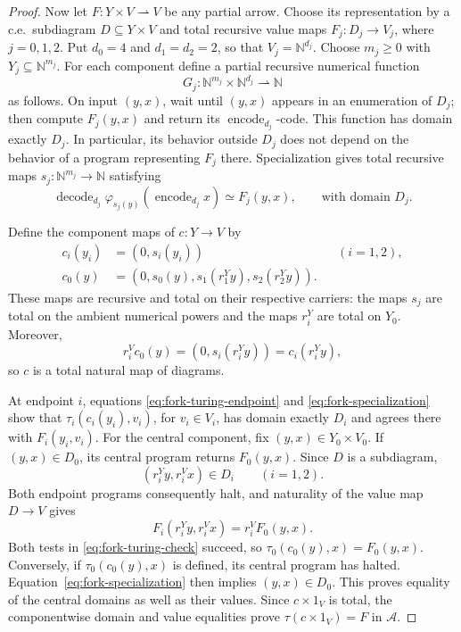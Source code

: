 \documentclass[11pt]{article}
\newcommand{\N}{\mathbb N}
\begin{document}
\begin{proof}
Now let $F:Y\times V\rightharpoonup V$ be any partial arrow.
Choose its representation by a c.e.\ subdiagram
$D\subseteq Y\times V$ and total recursive value maps
$F_j:D_j\to V_j$, where $j=0,1,2$.
Put $d_0=4$ and $d_1=d_2=2$, so that $V_j=\N^{d_j}$.
Choose $m_j\geq0$ with $Y_j\subseteq\N^{m_j}$.
For each component define a partial recursive numerical function
\[
 G_j:\N^{m_j}\times\N^{d_j}\rightharpoonup\N
\]
as follows. On input $(y,x)$, wait until $(y,x)$ appears in an
enumeration of $D_j$; then compute $F_j(y,x)$ and return its
$\operatorname{encode}_{d_j}$-code. This function has domain
exactly $D_j$. In particular, its behavior outside $D_j$ does
not depend on the behavior of a program representing $F_j$ there.
Specialization gives total recursive maps
$s_j:\N^{m_j}\to\N$ satisfying
\begin{equation}\label{eq:fork-specialization}
 \operatorname{decode}_{d_j}
   \varphi_{s_j(y)}(\operatorname{encode}_{d_j}x)
 \simeq F_j(y,x),
 \qquad\text{with domain }D_j.
\end{equation}

Define the component maps of $c:Y\to V$ by
\begin{align*}
 c_i(y_i)&=(0,s_i(y_i)) &&(i=1,2),\\
 c_0(y)&=(0,s_0(y),s_1(r_1^Yy),s_2(r_2^Yy)).
\end{align*}
These maps are recursive and total on their respective carriers:
the maps $s_j$ are total on the ambient numerical powers and the
maps $r_i^Y$ are total on $Y_0$. Moreover,
\[
 r_i^Vc_0(y)=(0,s_i(r_i^Yy))=c_i(r_i^Yy),
\]
so $c$ is a total natural map of diagrams.

At endpoint $i$, equations
\eqref{eq:fork-turing-endpoint} and
\eqref{eq:fork-specialization} show that
$\tau_i(c_i(y_i),v_i)$, for $v_i\in V_i$, has domain exactly
$D_i$ and agrees there with $F_i(y_i,v_i)$.
For the central component, fix $(y,x)\in Y_0\times V_0$.
If $(y,x)\in D_0$, its central program returns $F_0(y,x)$.
Since $D$ is a subdiagram,
\[
 (r_i^Yy,r_i^Vx)\in D_i\qquad(i=1,2).
\]
Both endpoint programs consequently halt, and naturality of
the value map $D\to V$ gives
\[
 F_i(r_i^Yy,r_i^Vx)=r_i^VF_0(y,x).
\]
Both tests in \eqref{eq:fork-turing-check} succeed, so
$\tau_0(c_0(y),x)=F_0(y,x)$.
Conversely, if $\tau_0(c_0(y),x)$ is defined, its central
program has halted. Equation~\eqref{eq:fork-specialization}
then implies $(y,x)\in D_0$.
This proves equality of the central domains as well as their
values. Since $c\times1_V$ is total, the componentwise domain
and value equalities prove $\tau(c\times1_V)=F$ in $\mathcal A$.
\end{proof}
\end{document}
